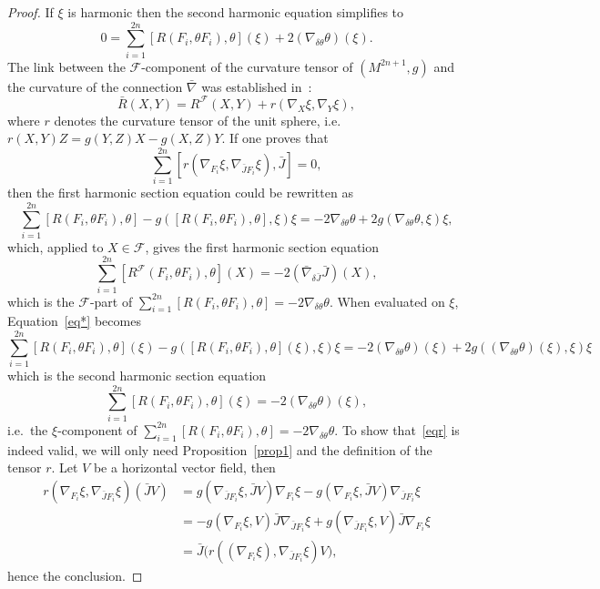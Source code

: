 \documentclass[a4paper,reqno]{amsart}
\theoremstyle{definition}
\theoremstyle{remark}
\theoremstyle{plain}
\numberwithin{equation}{section}
\newcommand{\f}{\mathcal{F}}
\begin{document}
\begin{proof} 
If $\xi$ is harmonic then the second harmonic equation simplifies to
$$
0=\sum_{i=1}^{2n}[R(F_i,\theta  F_i),\theta ] (\xi)+
2(\nabla_{\delta \theta} \theta) (\xi).
$$ 
The link between the $\f$-component of the curvature tensor of
$(M^{2n+1},g)$ and the curvature of the connection $\bar{\nabla}$
was established in~\cite{thesis}:
$$
\bar{R}(X,Y)= R^{\mathcal{F}}(X,Y)+r(\nabla_X \xi , \nabla_Y
\xi),
$$
where $r$ denotes the curvature tensor of the unit sphere,
i.e.~$r(X,Y)Z = g(Y , Z) X - g(X , Z) Y$. 
If one proves that
\begin{equation}\label{eqr}
\sum_{i=1}^{2n}[r(\nabla_{F_i} \xi , \nabla_{\bar{J}F_i} \xi),\bar{J} ] =0 ,
\end{equation}
then the first harmonic section equation could be rewritten as
\begin{equation} \label{eq*}
\sum_{i=1}^{2n}[R(F_i,\theta  F_i),\theta ] -  g([R(F_i,\theta  F_i),\theta ], \xi) \xi=-2\nabla_{\delta \theta} \theta+ 2  g(\nabla_{\delta \theta} \theta ,\xi) \xi ,
\end{equation}
which, applied to $X\in \f$, gives the first harmonic section equation 
$$
\sum_{i=1}^{2n}[R^{\mathcal{F}}(F_i,\theta  F_i),\theta ] (X)=
-2(\bar{\nabla}_{\delta \bar{J}} \bar{J})(X) ,
$$ 
which is the $\f$-part of 
$
\sum_{i=1}^{2n}[R(F_i,\theta  F_i),\theta ] =-2\nabla_{\delta
  \theta} \theta$.
When evaluated on $\xi$, Equation~\eqref{eq*} becomes
$$
\sum_{i=1}^{2n}[R(F_i,\theta  F_i),\theta ] (\xi)-
g([R(F_i,\theta  F_i),\theta ](\xi), \xi) \xi=-2(\nabla_{\delta
  \theta} \theta) (\xi)+ 2   g((\nabla_{\delta \theta}
\theta)(\xi) ,\xi) \xi
$$
which is the second harmonic section equation
$$
\sum_{i=1}^{2n}[R(F_i,\theta  F_i),\theta ] (\xi)
=-2(\nabla_{\delta \theta} \theta) (\xi),
$$
i.e.~the $\xi$-component of 
$\sum_{i=1}^{2n}[R(F_i,\theta  F_i),\theta ] =-2\nabla_{\delta
  \theta} \theta$.
To show that~\eqref{eqr} is indeed valid, we will only need
Proposition~\ref{prop1} and the definition of the tensor $r$. Let
$V$ be a horizontal vector field, then
\begin{align*} 
r(\nabla_{F_i}\xi , \nabla_{\bar{J}F_i}\xi) (\bar{J} V) &=  g(\nabla_{\bar{J}F_i}\xi, \bar{J} V) \nabla_{F_i}\xi - g(\nabla_{F_i}\xi , \bar{J}V) \nabla_{\bar{J}F_i}\xi \\
& = -g(\nabla_{F_i}\xi  ,  V ) \bar{J}\nabla_{\bar{J}F_i}\xi +  g(\nabla_{\bar{J}F_i}\xi , V) \bar{J}\nabla_{F_i}\xi \\
& = \bar{J}\big(r(  (\nabla_{F_i}\xi) , \nabla_{\bar{J}F_i}\xi)V\big),
\end{align*}
hence the conclusion.
\end{proof}
\end{document}
